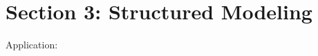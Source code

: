 
\section{Section 3: Structured Modeling }


\begin{frame}

\end{frame}


\begin{frame}{Application: }

\end{frame}

